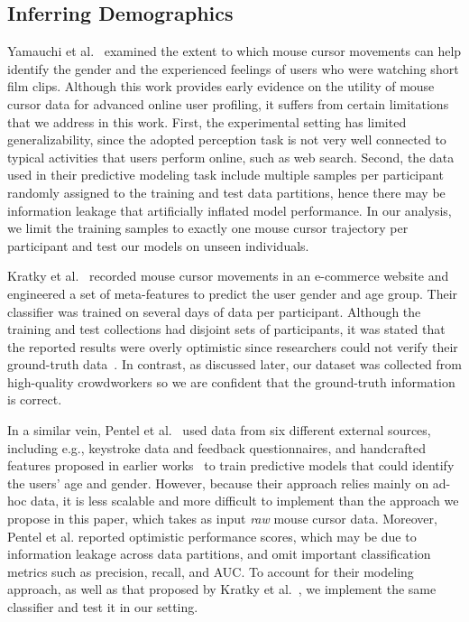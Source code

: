 \documentclass[sn-mathphys, pdflatex]{sn-jnl}
\begin{document}
\subsection{Inferring Demographics}
\label{sec:demographic_attributes}

Yamauchi et al.~\cite{Yamauchi2014} examined the extent to which mouse cursor movements can help identify the gender
and the experienced feelings of users who were watching short film clips.
Although this work provides early evidence on the utility of mouse cursor data for advanced online user profiling,
it suffers from certain limitations that we address in this work.
First, the experimental setting has limited generalizability,
since the adopted perception task is not very well connected
to typical activities that users perform online, such as web search.
Second, the data used in their predictive modeling task include multiple samples per participant
randomly assigned to the training and test data partitions,
hence there may be information leakage that artificially inflated model performance.
In our analysis, we limit the training samples to exactly one mouse cursor trajectory per participant
and test our models on unseen individuals.

Kratky et al.~\cite{Kratky16_demographics} recorded mouse cursor movements in an e-commerce website
and engineered a set of meta-features to predict the user gender and age group.
Their classifier was trained on several days of data per participant.
Although the training and test collections had disjoint sets of participants,
it was stated that the reported results were overly optimistic
since researchers could not verify their ground-truth data~\cite{Kratky16_demographics}.
In contrast, as discussed later,
our dataset was collected from high-quality crowdworkers
so we are confident that the ground-truth information is correct.

In a similar vein, Pentel et al.~\cite{Pentel2017} used data from six different external sources,
including e.g., keystroke data and feedback questionnaires,
and handcrafted features proposed in earlier works~\cite{Claypool01_iii, Diriye12_leaving, Shapira06_ii}
to train predictive models that could identify the users' age and gender.
However, because their approach relies mainly on ad-hoc data,
it is less scalable and more difficult to implement than the approach we propose in this paper,
which takes as input \emph{raw} mouse cursor data.
Moreover, Pentel et al. reported optimistic performance scores,
which may be due to information leakage across data partitions,
and omit important classification metrics such as precision, recall, and AUC.
To account for their modeling approach, as well as that proposed by Kratky et al.~\cite{Kratky16_demographics},
we implement the same classifier and test it in our setting.
\end{document}

